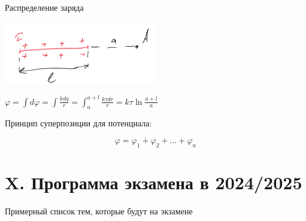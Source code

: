 \documentclass[12pt]{article}
\begin{document}
 Распределение заряда 

\begin{center}
    \includegraphics[width=0.5\textwidth]{physics1/images/physics1_2024_11_25_5}
\end{center}

$\varphi = \int d\varphi = \int \frac{kdq}{r} = \int_a^{a + l} \frac{k\tau dr}{r} = k\tau \ln\frac{a + l}{a}$

\mediumvspace

Принцип суперпозиции для потенциала:

\[\varphi = \varphi_1 + \varphi_2 + \dots + \varphi_n\]








    \clearpage

    \section{X. Программа экзамена в 2024/2025}

    Примерный список тем, которые будут на экзамене
\end{document}
